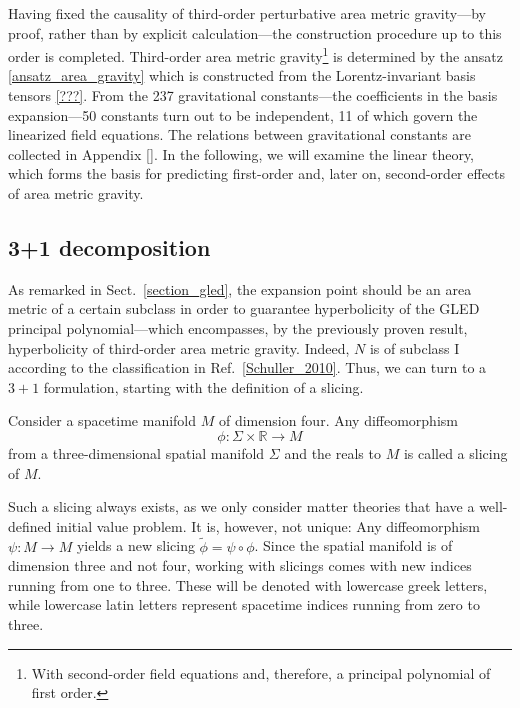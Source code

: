 Having fixed the causality of third-order perturbative area metric gravity---by proof, rather than by explicit calculation---the construction procedure up to this order is completed. Third-order area metric gravity\footnote{With second-order field equations and, therefore, a principal polynomial of first order.} is determined by the ansatz \eqref{ansatz_area_gravity} which is constructed from the Lorentz-invariant basis tensors \eqref{???}. From the 237 gravitational constants---the coefficients in the basis expansion---50 constants turn out to be independent, 11 of which govern the linearized field equations. The relations between gravitational constants are collected in Appendix \ref{}. In the following, we will examine the linear theory, which forms the basis for predicting first-order and, later on, second-order effects of area metric gravity.

\subsection{3+1 decomposition}
\label{sect_three_plus_one}
As remarked in Sect.~\ref{section_gled}, the expansion point should be an area metric of a certain subclass in order to guarantee hyperbolicity of the GLED principal polynomial---which encompasses, by the previously proven result, hyperbolicity of third-order area metric gravity. Indeed, $N$ is of subclass I according to the classification in Ref.~\ref{Schuller_2010}. Thus, we can turn to a $3+1$ formulation, starting with the definition of a slicing.
\begin{definition}[slicing]
  Consider a spacetime manifold $M$ of dimension four. Any diffeomorphism
  \begin{equation}
    \phi\colon \Sigma\times\mathbb R \rightarrow M
  \end{equation}
  from a three-dimensional spatial manifold $\Sigma$ and the reals to $M$ is called a slicing of $M$.
\end{definition}
Such a slicing always exists, as we only consider matter theories that have a well-defined initial value problem. It is, however, not unique: Any diffeomorphism $\psi\colon M\rightarrow M$ yields a new slicing $\tilde\phi = \psi\circ\phi$. Since the spatial manifold is of dimension three and not four, working with slicings comes with new indices running from one to three. These will be denoted with lowercase greek letters, while lowercase latin letters represent spacetime indices running from zero to three.

